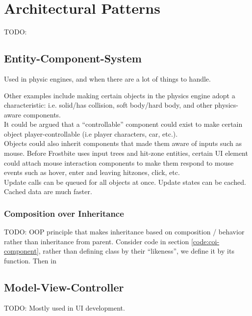 \section{Architectural Patterns}

TODO:

\subsection{Entity-Component-System}\label{ssection:ecs}

Used in physic engines, and when there are a lot of things to handle.


Other examples include making certain objects in the physics engine adopt a characteristic: i.e. solid/has collision, soft body/hard body, and other physics-aware components.\bs
\\
It could be argued that a ``controllable'' component could exist to make certain object player-controllable (i.e player characters, car, etc.).\bs
\\
Objects could also inherit components that made them aware of inputs such as mouse. Before Frostbite uses input trees and hit-zone entities, certain UI element could attach mouse interaction components to make them respond to mouse events such as hover, enter and leaving hitzones, click, etc.\bs
\\

Update calls can be queued for all objects at once. Update states can be cached. Cached data are much faster.

\subsubsection{Composition over Inheritance}

TODO:
OOP principle that makes inheritance based on composition / behavior rather than inheritance from parent.
\bs
Consider code in section \ref{code:coi-component}, rather than defining class by their ``likeness'', we define it by its function.
\bs
Then in 

\subsection{Model-View-Controller}

TODO: Mostly used in UI development. 